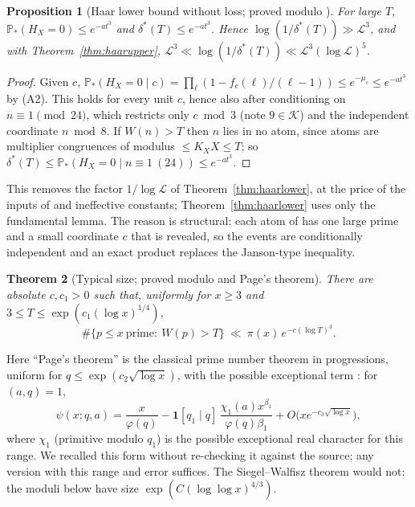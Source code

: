 \documentclass[11pt,reqno]{amsart}
\newtheorem{theorem}{Theorem}[section]
\newtheorem{proposition}[theorem]{Proposition}
\theoremstyle{definition}
\newcommand{\Lc}{\mathcal L}
\newcommand{\PP}{\mathbb P}
\begin{document}
\begin{proposition}[Haar lower bound without loss; proved modulo \cite{TQ}]\label{prop:haarnoloss}
For large $T$, $\PP_*(H_X=0)\le e^{-at^3}$ and $\delta^*(T)\le e^{-at^3}$.  Hence
$\log(1/\delta^*(T))\gg\Lc^3$, and with Theorem~\ref{thm:haarupper},
$\Lc^3\ll\log(1/\delta^*(T))\ll\Lc^3(\log\Lc)^5$.
\end{proposition}

\begin{proof}
Given $c$, $\PP_*(H_X=0\mid c)=\prod_\ell(1-f_c(\ell)/(\ell-1))\le e^{-\mu_c}\le e^{-at^3}$ by
(A2).  This holds for every unit $c$, hence also after conditioning on
$n\equiv1\pmod{24}$, which restricts only $c\bmod3$ (note $9\in\mathcal K$) and the
independent coordinate $n\bmod8$.  If $W(n)>T$ then $n$ lies in no atom, since
atoms are multiplier congruences of modulus $\le K_XX\le T$; so $\delta^*(T)\le
\PP_*(H_X=0\mid n\equiv1\ (24))\le e^{-at^3}$.
\end{proof}

This removes the factor $1/\log\Lc$ of Theorem~\ref{thm:haarlower}, at the
price of the inputs of \cite{TQ} and ineffective constants;
Theorem~\ref{thm:haarlower} uses only the fundamental lemma.  The reason is
structural: each atom of \cite{TQ} has one large prime and a small
coordinate $c$ that is revealed, so the events are conditionally
independent and an exact product replaces the Janson-type inequality.

\begin{theorem}[Typical size; proved modulo \cite{TQ} and Page's theorem]\label{thm:typical}
There are absolute $c,c_1>0$ such that, uniformly for $x\ge3$ and
$3\le T\le\exp(c_1(\log x)^{1/4})$,
\[
 \#\{p\le x\ \text{prime}:\ W(p)>T\}\ \ll\ \pi(x)\,e^{-c(\log T)^3}.
\]
\end{theorem}

Here ``Page's theorem'' is the classical prime number theorem in
progressions, uniform for $q\le\exp(c_2\sqrt{\log x})$, with the possible
exceptional term \cite[Ch.~20]{Dav}: for $(a,q)=1$,
\begin{equation}\label{eq:page}
 \psi(x;q,a)=\frac x{\varphi(q)}-\mathbf 1[q_1\mid q]\,\frac{\chi_1(a)x^{\beta_1}}{\varphi(q)\beta_1}+O\big(xe^{-c_3\sqrt{\log x}}\big),
\end{equation}
where $\chi_1$ (primitive modulo $q_1$) is the possible exceptional real
character for this range.  We recalled this form without re-checking it
against the source; any version with this range and error suffices.
The Siegel--Walfisz theorem would not: the moduli below have size
$\exp(C(\log\log x)^{4/3})$.
\end{document}
